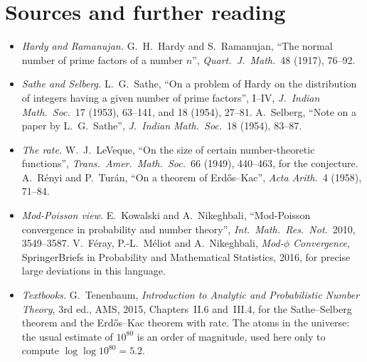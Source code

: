 \section*{Sources and further reading}

\begin{itemize}
\item \emph{Hardy and Ramanujan.} G.~H.~Hardy and S.~Ramanujan, ``The normal number of prime factors of a number $n$'', \emph{Quart.\ J.\ Math.}\ 48 (1917), 76--92.
\item \emph{Sathe and Selberg.} L.~G.~Sathe, ``On a problem of Hardy on the distribution of integers having a given number of prime factors'', I--IV, \emph{J.\ Indian Math.\ Soc.}\ 17 (1953), 63--141, and 18 (1954), 27--81. A.~Selberg, ``Note on a paper by L.~G.~Sathe'', \emph{J.\ Indian Math.\ Soc.}\ 18 (1954), 83--87.
\item \emph{The rate.} W.~J.~LeVeque, ``On the size of certain number-theoretic functions'', \emph{Trans.\ Amer.\ Math.\ Soc.}\ 66 (1949), 440--463, for the conjecture. A.~Rényi and P.~Turán, ``On a theorem of Erd\H{o}s--Kac'', \emph{Acta Arith.}\ 4 (1958), 71--84.
\item \emph{Mod-Poisson view.} E.~Kowalski and A.~Nikeghbali, ``Mod-Poisson convergence in probability and number theory'', \emph{Int.\ Math.\ Res.\ Not.}\ 2010, 3549--3587. V.~Féray, P.-L.~Méliot and A.~Nikeghbali, \emph{Mod-$\phi$ Convergence}, SpringerBriefs in Probability and Mathematical Statistics, 2016, for precise large deviations in this language.
\item \emph{Textbooks.} G.~Tenenbaum, \emph{Introduction to Analytic and Probabilistic Number Theory}, 3rd ed., AMS, 2015, Chapters~II.6 and~III.4, for the Sathe--Selberg theorem and the Erd\H{o}s--Kac theorem with rate. The atoms in the universe: the usual estimate of $10^{80}$ is an order of magnitude, used here only to compute $\log\log10^{80}=5.2$.
\end{itemize}
